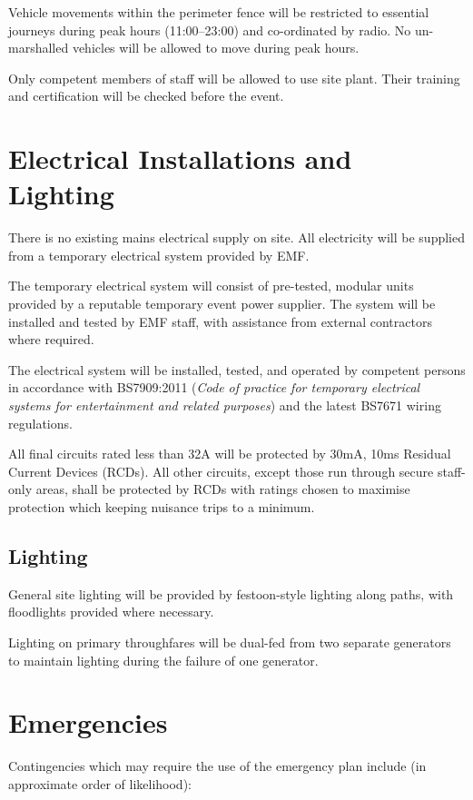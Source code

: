 Vehicle movements within the perimeter fence will be restricted to essential
journeys during peak hours (11:00--23:00) and co-ordinated by radio. No
un-marshalled vehicles will be allowed to move during peak hours.

Only competent members of staff will be allowed to use site plant. Their
training and certification will be checked before the event.

\section{Electrical Installations and Lighting}

There is no existing mains electrical supply on site. All electricity will be
supplied from a temporary electrical system provided by EMF.

The temporary electrical system will consist of pre-tested, modular units
provided by a reputable temporary event power supplier. The system will be
installed and tested by EMF staff, with assistance from external contractors
where required.

The electrical system will be installed, tested, and operated by competent
persons in accordance with BS7909:2011 (\textit{Code of practice for temporary
electrical systems for entertainment and related purposes}) and the latest
BS7671 wiring regulations.

All final circuits rated less than 32A will be protected by 30mA, 10ms Residual
Current Devices (RCDs).  All other circuits, except those run through secure
staff-only areas, shall be protected by RCDs with ratings chosen to maximise
protection which keeping nuisance trips to a minimum.

\subsection{Lighting}
General site lighting will be provided by festoon-style lighting along paths,
with floodlights provided where necessary.

Lighting on primary throughfares will be dual-fed from two separate generators
to maintain lighting during the failure of one generator.

\section{Emergencies}
Contingencies which may require the use of the emergency plan include (in
approximate order of likelihood):

